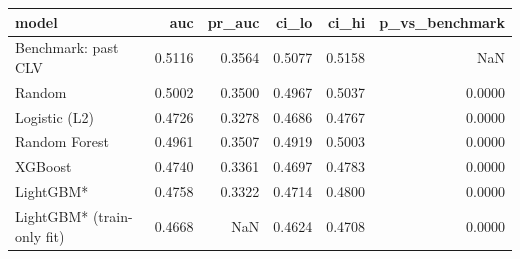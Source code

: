 \begin{tabular}{lrrrrr}
\toprule
model & auc & pr\_auc & ci\_lo & ci\_hi & p\_vs\_benchmark \\
\midrule
Benchmark: past CLV & 0.5116 & 0.3564 & 0.5077 & 0.5158 & NaN \\
Random & 0.5002 & 0.3500 & 0.4967 & 0.5037 & 0.0000 \\
Logistic (L2) & 0.4726 & 0.3278 & 0.4686 & 0.4767 & 0.0000 \\
Random Forest & 0.4961 & 0.3507 & 0.4919 & 0.5003 & 0.0000 \\
XGBoost & 0.4740 & 0.3361 & 0.4697 & 0.4783 & 0.0000 \\
LightGBM* & 0.4758 & 0.3322 & 0.4714 & 0.4800 & 0.0000 \\
LightGBM* (train-only fit) & 0.4668 & NaN & 0.4624 & 0.4708 & 0.0000 \\
\bottomrule
\end{tabular}

